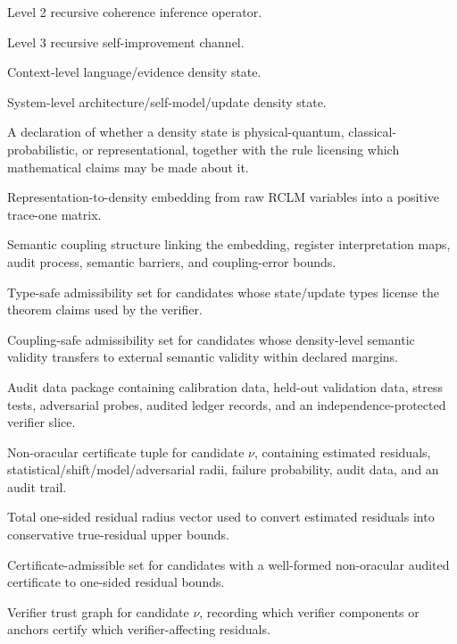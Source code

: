 \documentclass[11pt,a4paper]{article}
\newcommand{\Acal}{\mathcal A}
\newcommand{\Rcal}{\mathcal R}
\newcommand{\Gcal}{\mathcal G}
\newcommand{\NOCert}{\operatorname{NOCert}}
\newcommand{\RCLM}{\mathrm{RCLM}}
\newcommand{\sys}{\mathrm{sys}}
\newcommand{\ctx}{\mathrm{ctx}}
\newcommand{\aud}{\mathrm{aud}}
\newcommand{\ver}{\mathrm{ver}}
\newcommand{\cert}{\mathrm{cert}}
\newcommand{\coup}{\mathrm{coup}}
\begin{document}
\begin{description}[leftmargin=2.8cm, style=nextline]
    \item[\(\Rcal_{\theta}\)] Level 2 recursive coherence inference operator.
    \item[\(\Phi_t\)] Level 3 recursive self-improvement channel.
    \item[\(\rho_t^{\ctx}\)] Context-level language/evidence density state.
    \item[\(\rho_t^{\sys}\)] System-level architecture/self-model/update density state.
    \item[Typed density realization] A declaration of whether a density state is physical-quantum, classical-probabilistic, or representational, together with the rule licensing which mathematical claims may be made about it.
    \item[\(\mathsf E_t\)] Representation-to-density embedding from raw RCLM variables into a positive trace-one matrix.
    \item[\(\mathfrak C_t^{\RCLM}\)] Semantic coupling structure linking the embedding, register interpretation maps, audit process, semantic barriers, and coupling-error bounds.
    \item[\(\Acal_{\mathrm{type}}\)] Type-safe admissibility set for candidates whose state/update types license the theorem claims used by the verifier.
    \item[\(\Acal_{\coup}\)] Coupling-safe admissibility set for candidates whose density-level semantic validity transfers to external semantic validity within declared margins.
    \item[\(\mathcal Z_t^{\aud}\)] Audit data package containing calibration data, held-out validation data, stress tests, adversarial probes, audited ledger records, and an independence-protected verifier slice.
    \item[\(\NOCert_t(\nu)\)] Non-oracular certificate tuple for candidate \(\nu\), containing estimated residuals, statistical/shift/model/adversarial radii, failure probability, audit data, and an audit trail.
    \item[\(\Delta_t^{\cert}(\nu)\)] Total one-sided residual radius vector used to convert estimated residuals into conservative true-residual upper bounds.
    \item[\(\Acal_{\cert}\)] Certificate-admissible set for candidates with a well-formed non-oracular audited certificate to one-sided residual bounds.
    \item[\(\Gcal_t^{\ver}(\nu)\)] Verifier trust graph for candidate \(\nu\), recording which verifier components or anchors certify which verifier-affecting residuals.

\end{description}
\end{document}

